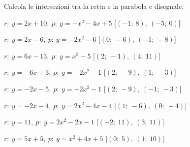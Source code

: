 \begin{esercizio}\label{ese:}
 Calcola le intersezioni tra la retta e la parabola e disegnale.
 \begin{enumeratea}
  \item  $r:~y = 2 x +10,~p:~y=- x^2 -4 x +5$
   \hfill [$\left (-1;~8 \right ),~\left (-5;~0 \right )$]
  \item  $r:~y = 2 x -6,~p:~y=-2 x^2 -6$
   \hfill [$\left (0;~-6 \right ),~\left (-1;~-8 \right )$]
  \item  $r:~y = 6 x -13,~p:~y=x^2 -5$
   \hfill [$\left (2;~-1 \right ),~\left (4;~11 \right )$]
  \item  $r:~y = -6 x +3,~p:~y=-2 x^2 -1$
   \hfill [$\left (2;~-9 \right ),~\left (1;~-3 \right )$]
  \item  $r:~y = -2 x -5,~p:~y=-2 x^2 -1$
   \hfill [$\left (2;~-9 \right ),~\left (-1;~-3 \right )$]
  \item  $r:~y = -2 x -4,~p:~y=2 x^2 -4 x -4$
   \hfill [$\left (1;~-6 \right ),~\left (0;~-4 \right )$]
  \item  $r:~y = 11,~p:~y=2 x^2 -2 x -1$
   \hfill [$\left (-2;~11 \right ),~\left (3;~11 \right )$]
  \item  $r:~y = 5 x +5,~p:~y=x^2 +4 x +5$
   \hfill [$\left (0;~5 \right ),~\left (1;~10 \right )$]
 \end{enumeratea}
\end{esercizio}

